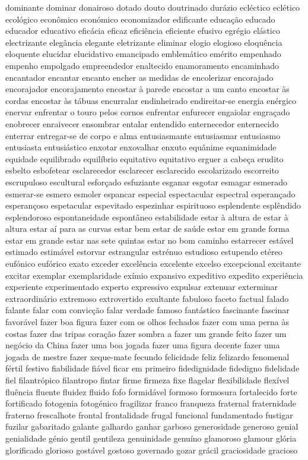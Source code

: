 \begin{appendices}
dominante dominar donairoso dotado douto doutrinado dur\'{a}zio ecl\'{e}ctico ecl\'{e}tico ecol\'{o}gico econ\^{o}mico econ\'{o}mico economizador edificante educa\c{c}\~ao educado educador educativo efic\'{a}cia eficaz efici\^{e}ncia eficiente efusivo egr\'{e}gio el\'{a}stico electrizante eleg\^{a}ncia elegante eletrizante eliminar elogio elogioso eloqu\^{e}ncia eloquente elucidar elucidativo emancipado emblem\'{a}tico em\'{e}rito empenhado empenho empolgado empreendedor enaltecido enamoramento encaminhado encantador encantar encanto encher as medidas de encolerizar encorajado encorajador encorajamento encostar \`{a} parede encostar a um canto encostar \`{a}s cordas encostar \`{a}s t\'{a}buas encurralar endinheirado endireitar-se energia en\'{e}rgico enervar enfrentar o touro pelos cornos enfrentar enfurecer engaiolar engra\c{c}ado enobrecer enraivecer ensombrar entalar entendido enternecedor enternecido enterrar entregar-se de corpo e alma entusiasmante entusiasmar entusiasmo entusiasta entusi\'{a}stico enxotar enxovalhar enxuto equ\^{a}nime equanimidade equidade equilibrado equil\'{i}brio equitativo equitativo erguer a cabe\c{c}a erudito esbelto esbofetear esclarecedor esclarecer esclarecido escolarizado escorreito escrupuloso escultural esfor\c{c}ado esfuziante esganar esgotar esmagar esmerado esmerar-se esmero esmoler espancar especial espectacular espectral esperan\c{c}ado esperan\c{c}oso espetacular espevitado espezinhar espirituoso esplendente espl\^{e}ndido esplendoroso espontaneidade espont\^{a}neo estabilidade estar \`{a} altura de estar \`{a} altura estar a\'{i} para as curvas estar bem estar de sa\'{u}de estar em grande forma estar em grande estar nas sete quintas estar no bom caminho estarrecer est\'{a}vel estimado estim\'{a}vel estorvar estrangular estr\'{e}nuo estudioso estupendo et\'{e}reo euf\'{o}nico euf\'{o}rico exato exceder excel\^{e}ncia excelente excelso excepcional excitante excitar exemplar exemplaridade ex\'{i}mio expansivo expeditivo expedito experi\^{e}ncia experiente experimentado experto expressivo expulsar extenuar exterminar extraordin\'{a}rio extremoso extrovertido exultante fabuloso faceto factual falado falante falar com convic\c{c}\~ao falar verdade famoso fant\'{a}stico fascinante fascinar favor\'{a}vel fazer boa figura fazer com os olhos fechados fazer com uma perna \`{a}s costas fazer das tripas cora\c{c}\~ao fazer sombra a fazer um grande feito fazer um neg\'{o}cio da China fazer uma boa jogada fazer uma figura decente fazer uma jogada de mestre fazer xeque-mate fecundo felicidade feliz felizardo fenomenal f\'{e}rtil festivo fiabilidade fi\'{a}vel ficar em primeiro fidedignidade fidedigno fidelidade fiel filantr\'{o}pico filantropo fintar firme firmeza fixe flagelar flexibilidade flex\'{i}vel flu\^{e}ncia fluente fluidez fluido fofo formid\'{a}vel formoso formosura fortalecido forte fortificado fotogenia fotog\'{e}nico fragilizar franco franqueza fraternal fraternidade fraterno frescalhote frontal frontalidade frugal funcional fundamentado fustigar fuzilar gabaritado galante galhardo ganhar garboso generosidade generoso genial genialidade g\'{e}nio gentil gentileza genuinidade genu\'{i}no glamoroso glamour gl\'{o}ria glorificado glorioso gost\'{a}vel gostoso governado gozar gr\'{a}cil graciosidade gracioso 
\end{appendices}
